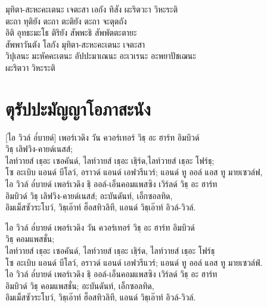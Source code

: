 \begin{english}
มุทิตา-สะหะคะเตนะ เจตะสา เอกัง ทิสัง ผะริตวะา วิหะระติ\\
ตะถา ทุติยัง ตะถา ตะติยัง ตะถา จะตุตถัง\\
อิติ อุทธะมะโธ ติริยัง สัพพะธิ สัพพัตตะตายะ\\
สัพพาวันตัง โลกัง มุทิตา-สะหะคะเตนะ เจตะสา\\
วิปุเลนะ มะหัคคะเตนะ อัปปะมาเณนะ อะเวเรนะ อะพยาปัชเฌนะ\\
\vin ผะริตวา วิหะระติ

\chapter{ตุรัปปะมัญญาโอภาสะนัง}


\begin{leader}
\end{leader}

\begin{english}
[ไอ วิวล์ อ๎บายด์] เพอร์เวดิง วัน ควอร์เทอร์ วิธฺ อะ ฮาร์ท อิมบิวด์\\
	\vin วิธฺ เลิฟวิง-คายด์เนสส์;\\
ไลท์วายส์ เธฺอะ เซอคันด์, ไลท์วายส์ เธฺอะ เธฺิร์ด,ไลท์วายส์ เธฺอะ โฟร์ธฺ;\\
โซ อะเบิบ แอนด์ บีโลว์, อราวด์ แอนด์ เอฟวรีแวร์; แอนด์ ทู ออล์ แอส ทู มายเซวล์ฟ,\\
ไอ วิวล์ อ๎บายด์ เพอร์เวดิง ธฺิ ออล์-เอ็นคอมแพสซิง เวิร์ลด์ วิธฺ อะ ฮาร์ท\\
	\vin อิมบิวด์ วิธฺ เลิฟวิง-คายด์เนสส์; อะบันดันท์, เอ็กซอลทิด,\\
	\vin อิมเม็สซัวระโบว์, วิธฺเอ๊าท์ ฮ็อสทิวลิที, แอนด์ วิธฺเอ๊าท์ อิวล์-วิวล์.
\end{english}

\begin{english}
ไอ วิวล์ อ๎บายด์ เพอร์เวดิง วัน ควอร์เทอร์ วิธฺ อะ ฮาร์ท อิมบิวด์\\
	\vin วิธฺ คอมแพสชั่น;\\
ไลท์วายส์ เธฺอะ เซอคันด์, ไลท์วายส์ เธฺอะ เธฺิร์ด, ไลท์วายส์ เธฺอะ โฟร์ธฺ\\
โซ อะเบิบ แอนด์ บีโลว์, อราวด์ แอนด์ เอฟวรีแวร์; แอนด์ ทู ออล์ แอส ทู มายเซวล์ฟ์.\\
ไอ วิวล์ อ๎บายด์ เพอร์เวดิง ธฺิ ออล์-เอ็นคอมแพสซิง เวิร์ลด์ วิธฺ อะ ฮาร์ท\\
	\vin อิมบิวด์ วิธฺ คอมแพสชั่น; อะบันดันท์, เอ็กซอลทิด,\\
	\vin อิมเม็สซัวระโบว์, วิธฺเอ๊าท์ ฮ็อสทิวลิที, แอนด์ วิธฺเอ๊าท์ อิวล์-วิวล์.
\end{english}


\end{english}
